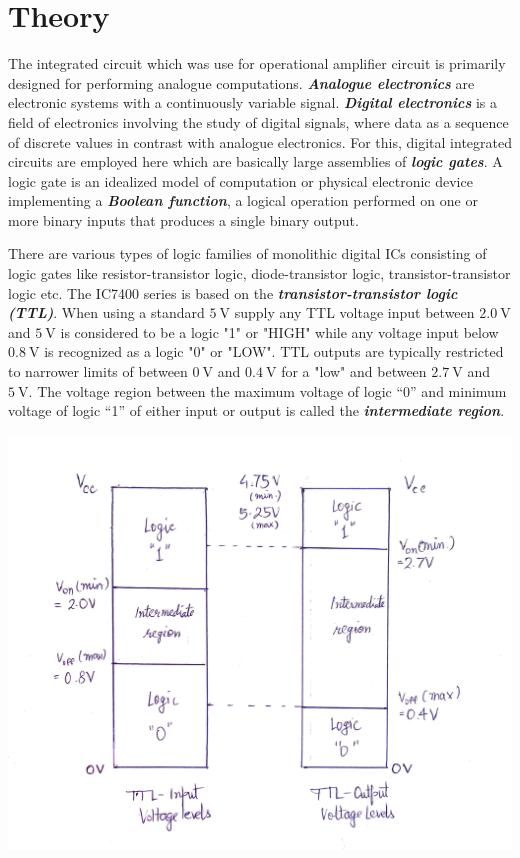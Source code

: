 \section{Theory}
\noindent The integrated circuit which was use for operational amplifier circuit is primarily designed for performing analogue computations. \textbf{\emph{Analogue electronics}} are electronic systems with a continuously variable signal. \textbf{\emph{Digital electronics}} is a field of electronics involving the study of digital signals, where data as a sequence of discrete values in contrast with analogue electronics. For this, digital integrated circuits are employed here which are basically large assemblies of \textbf{\emph{logic gates}}. A logic gate is an idealized model of computation or physical electronic device implementing a \textbf{\emph{Boolean function}}, a logical operation performed on one or more binary inputs that produces a single binary output.
\par
\noindent There are various types of logic families of monolithic digital ICs consisting of logic gates like resistor-transistor logic, diode-transistor logic, transistor-transistor logic etc. The IC7400 series is based on the \textbf{\emph{transistor-transistor logic (TTL)}}. When using a standard $\SI{+5}{\volt}$ supply any TTL voltage input between $\SI{2.0}{\volt}$ and $\SI{5}{\volt}$ is considered to be a logic "1" or "HIGH" while any voltage input below $\SI{0.8}{\volt}$ is recognized as a logic "0" or "LOW". TTL outputs are typically restricted to narrower limits of between $\SI{0}{\volt}$ and $\SI{0.4}{\volt}$ for a "low" and between $\SI{2.7}{\volt}$ and $\SI{5}{\volt}$. The voltage region between the maximum voltage of logic “0” and minimum voltage of logic “1” of either input or output is called the \textbf{\emph{intermediate region}}.
\begin{center}
    \includegraphics[scale = 0.16]{Documents/1615791787718.jpg}
\end{center}
